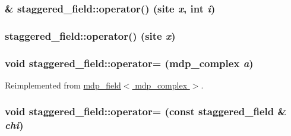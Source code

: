 \label{classstaggered__field_a8cee97da0e262753ab059ef553597a01}
\hypertarget{classstaggered__field_a32b4553845d0b7f92f99f07e0fbeb64a}{
\subsubsection[{operator()}]{\& staggered\_\-field::operator() (site {\em x}, \/  int {\em i})}}
\label{classstaggered__field_a32b4553845d0b7f92f99f07e0fbeb64a}
\hypertarget{classstaggered__field_aa881451872889aa0b6c716c01f3fabb7}{
\subsubsection[{operator()}]{ staggered\_\-field::operator() (site {\em x})}}
\label{classstaggered__field_aa881451872889aa0b6c716c01f3fabb7}
\hypertarget{classstaggered__field_ac3fee1898eaa4198744c5bc0cc969e2e}{
\subsubsection[{operator=}]{\setlength{\rightskip}{0pt plus 5cm}void staggered\_\-field::operator= ({\bf mdp\_\-complex} {\em a})}}
\label{classstaggered__field_ac3fee1898eaa4198744c5bc0cc969e2e}


Reimplemented from \hyperlink{classmdp__field_a24364bce6444668661a0688632af87ec}{mdp\_\-field$<$ mdp\_\-complex $>$}.\hypertarget{classstaggered__field_a5320371c9d4b87255c578e5b41684e48}{
\subsubsection[{operator=}]{\setlength{\rightskip}{0pt plus 5cm}void staggered\_\-field::operator= (const {\bf staggered\_\-field} \& {\em chi})}}
\label{classstaggered__field_a5320371c9d4b87255c578e5b41684e48}


